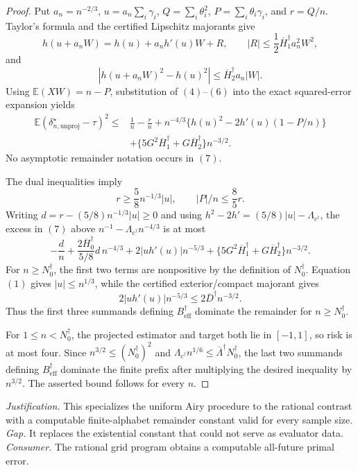 \documentclass{article}
\begin{document}
{\begin{proof}
Put \(a_n=n^{-2/3}\),
\(u=a_n\sum_i\gamma_i\), \(Q=\sum_i\theta_i^2\),
\(P=\sum_i\theta_i\gamma_i\), and \(r=Q/n\).
Taylor's formula and the certified Lipschitz majorants give
\[
h(u+a_nW)=h(u)+a_nh'(u)W+R,
\qquad |R|\le\frac12\overline H_1^\dagger a_n^2W^2,
\tag{5}
\]
and
\[
|h(u+a_nW)^2-h(u)^2|
\le\overline H_2^\dagger a_n|W|.
\tag{6}
\]
Using \(\mathbb E(XW)=n-P\), substitution of \((4)\)--\((6)\) into the exact squared-error expansion yields
\[
\begin{aligned}
\mathbb E(\delta_{n,\mathrm{unproj}}^\star-\tau)^2
\le{}&\frac1n-\frac rn
+n^{-4/3}\{h(u)^2-2h'(u)(1-P/n)\}\\
&+\{5G^2\overline H_1^\dagger
+G\overline H_2^\dagger\}n^{-3/2}.
\end{aligned}
\tag{7}
\]
No asymptotic remainder notation occurs in \((7)\).

The dual inequalities imply
\[
r\ge\frac58n^{-1/3}|u|,
\qquad |P|/n\le\frac85r.
\tag{8}
\]
Writing \(d=r-(5/8)n^{-1/3}|u|\ge0\) and using
\(h^2-2h'=(5/8)|u|-\Lambda_{c^\dagger}\), the excess in \((7)\) above
\(n^{-1}-\Lambda_{c^\dagger}n^{-4/3}\) is at most
\[
-\frac dn+\frac{2\overline H_0^\dagger}{5/8}d\,n^{-4/3}
+2|uh'(u)|n^{-5/3}
+\{5G^2\overline H_1^\dagger+G\overline H_2^\dagger\}n^{-3/2}.
\tag{9}
\]
For \(n\ge N_0^\dagger\), the first two terms are nonpositive by the definition of \(N_0^\dagger\).  Equation \((1)\) gives \(|u|\le n^{1/3}\), while the certified exterior/compact majorant gives
\[
2|uh'(u)|n^{-5/3}\le2\overline D^\dagger n^{-3/2}.
\tag{10}
\]
Thus the first three summands defining \(B_{\mathrm{eff}}^\dagger\) dominate the remainder for \(n\ge N_0^\dagger\).

For \(1\le n<N_0^\dagger\), the projected estimator and target both lie in \([-1,1]\), so risk is at most four.  Since
\(n^{3/2}\le(N_0^\dagger)^2\) and
\(\Lambda_{c^\dagger}n^{1/6}\le\overline\Lambda^\dagger N_0^\dagger\), the last two summands defining
\(B_{\mathrm{eff}}^\dagger\) dominate the finite prefix after multiplying the desired inequality by \(n^{3/2}\).  The asserted bound follows for every \(n\).
\end{proof}
\par\smallskip\noindent \textit{Justification.} This specializes the uniform Airy procedure to the rational contrast with a computable finite-alphabet remainder constant valid for every sample size. \textit{Gap.} It replaces the existential constant that could not serve as evaluator data. \textit{Consumer.} The rational grid program obtains a computable all-future primal error.

}
\end{document}
